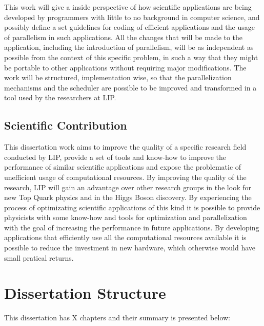 This work will give a inside perspective of how scientific applications are being developed by programmers with little to no background in computer science, and possibly define a set guidelines for coding of efficient applications and the usage of parallelism in such applications. All the changes that will be made to the \tth application, including the introduction of parallelism, will be as independent as possible from the context of this specific problem, in such a way that they might be portable to other applications without requiring major modifications. The work will be structured, implementation wise, so that the parallelization mechanisms and the scheduler are possible to be improved and transformed in a tool used by the researchers at LIP.

\subsection{Scientific Contribution}
\label{ScientificContribution}

This dissertation work aims to improve the quality of a specific research field conducted by LIP, provide a set of tools and know-how to improve the performance of similar scientific applications and expose the problematic of unefficient usage of computational resources. By improving the quality of the research, LIP will gain an advantage over other research groups in the look for new Top Quark physics and in the Higgs Boson discovery. By experiencing the process of optimizating scientific applications of this kind it is possible to provide physicists with some know-how and tools for optimization and parallelization with the goal of increasing the performance in future applications. By developing applications that efficiently use all the computational resources available it is possible to reduce the investment in new hardware, which otherwise would have small pratical returns.

\section{Dissertation Structure}
\label{DissertationStructure}

This dissertation has X chapters and their summary is presented below:

